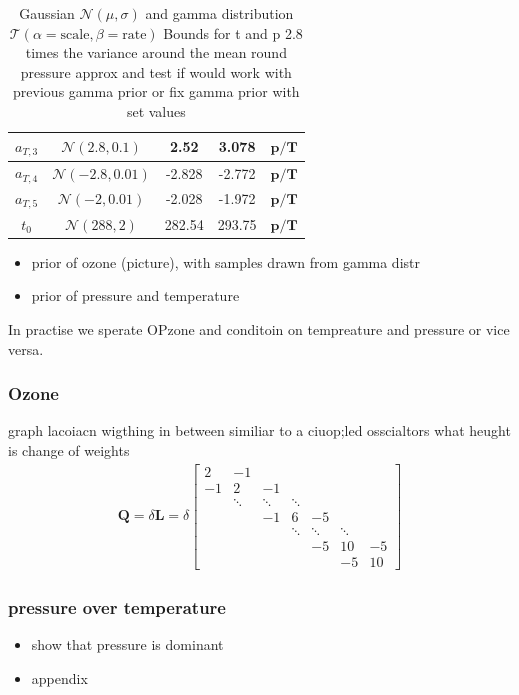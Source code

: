 \begin{table}
\begin{tabular}{ |c||c|c|c|c|   }
		$a_{T,3}$ &  $\mathcal{N}(2.8,0.1)$&2.52 &3.078&$\bm{p/T}$\\ \hline
		$a_{T,4}$ &  $\mathcal{N}(-2.8,0.01)$&-2.828 &-2.772&$\bm{p/T}$\\ \hline
		$a_{T,5}$ & $\mathcal{N}(-2,0.01)$ &-2.028 &-1.972&$\bm{p/T}$\\ \hline
		$t_{0}$ &  $\mathcal{N}(288,2)$& 282.54 &293.75&$\bm{p/T}$\\
		\hline
	\end{tabular}
	\caption{Gaussian $\mathcal{N}(\mu,\sigma)$ and gamma distribution $\mathcal{T}(\alpha = \text{scale}, \beta = \text{rate})$
		Bounds for t and p 2.8 times the variance around the mean
		round pressure approx and  test if would work with previous gamma prior or fix gamma prior with set values}
	\label{tab:1}
\end{table}

\begin{itemize}
	\item prior of ozone (picture), with samples drawn from gamma distr
	\item prior of pressure and temperature
\end{itemize}
In practise we sperate OPzone and conditoin on tempreature and pressure  or vice versa. 
\subsubsection{Ozone}
graph lacoiacn 
wigthing in between
similiar to a ciuop;led osscialtors
what heught is change of weights
\begin{align}
	\bm{Q}= \delta \bm{L} =
	\delta
	\begin{bmatrix}
		2 & -1 & & &  \\
		-1 & 2 & -1 & &   \\
		& \ddots & \ddots & \ddots &\\ 
		&   & -1 & 6 & -5 \\
		& & & \ddots & \ddots & \ddots  \\ 
		& & & &  -5 & 10 & -5 \\
		& & & & & -5 & 10 
	\end{bmatrix}  
\end{align}

\subsubsection{pressure over temperature}


\begin{itemize}
	\item show that pressure is dominant
	\item appendix
\end{itemize}





